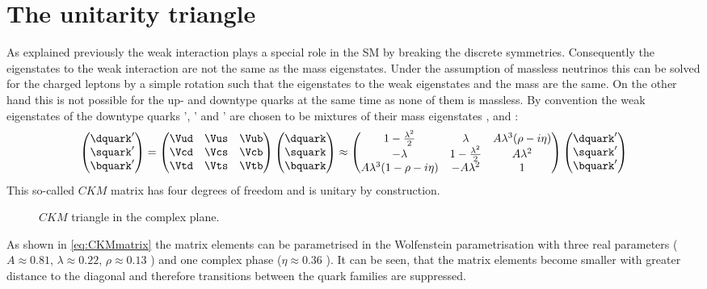 \section{The unitarity triangle}
\label{sec:unitarityTriangle}

As explained previously the weak interaction plays a special role in the \ac{SM} by breaking the discrete symmetries.
Consequently the eigenstates to the weak interaction are not the same as the mass eigenstates.
Under the assumption of massless neutrinos this can be solved for the charged leptons by a simple rotation such that the eigenstates to the weak eigenstates and the mass are the same.
On the other hand this is not possible for the up- and downtype quarks at the same time as none of them is massless.
By convention the weak eigenstates of the downtype quarks \dquark', \squark' and \bquark' are chosen to be mixtures of their mass eigenstates \dquark, \squark and \bquark:
\begin{equation}
\begin{pmatrix} \dquark' \\ \squark' \\ \bquark' \end{pmatrix}
= \begin{pmatrix} \Vud & \Vus & \Vub \\ \Vcd & \Vcs & \Vcb \\ \Vtd & \Vts & \Vtb \end{pmatrix}
\begin{pmatrix} \dquark \\ \squark \\ \bquark \end{pmatrix}
\approx \begin{pmatrix} 1-\frac{\lambda^2}{2} & \lambda & A\lambda^3(\rho-i\eta) \\
                        -\lambda & 1-\frac{\lambda^2}{2} & A\lambda^2 \\
                        A\lambda^3(1-\rho-i\eta) & -A\lambda^2 & 1 \end{pmatrix}
\begin{pmatrix} \dquark' \\ \squark' \\ \bquark' \end{pmatrix} \label{eq:CKMmatrix}
\end{equation}
This so-called $CKM$ matrix has four degrees of freedom and is unitary by construction.
\begin{figure}[tbp]
	\centering
	
	\caption{$CKM$ triangle in the complex plane.}
	\label{fig:ckmtheory}
\end{figure}
As shown in \cref{eq:CKMmatrix} the matrix elements can be parametrised in the Wolfenstein parametrisation \cite{Wolfenstein:1983yz} with three real parameters ($A\approx0.81$, $\lambda\approx0.22$, $\rho\approx0.13$ \cite{PDG_2017}) and one complex phase ($\eta\approx0.36$ \cite{PDG_2017}).
It can be seen, that the matrix elements become smaller with greater distance to the diagonal and therefore transitions between the quark families are suppressed.

